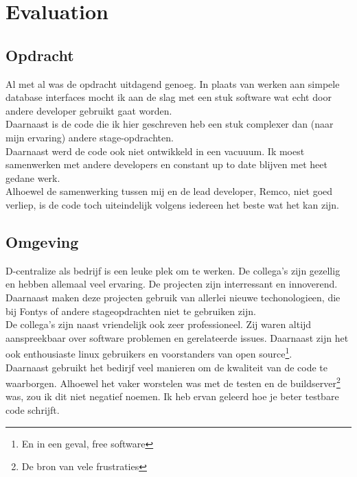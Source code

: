 \chapter{Evaluation}

\section{Opdracht}

Al met al was de opdracht uitdagend genoeg. In plaats van werken aan simpele database interfaces mocht ik aan de slag met een stuk software wat echt door andere developer gebruikt gaat worden. \\

Daarnaast is de code die ik hier geschreven heb een stuk complexer dan (naar mijn ervaring) andere stage-opdrachten. \\

Daarnaast werd de code ook niet ontwikkeld in een vacuuum. Ik moest samenwerken met andere developers en constant up to date blijven met heet gedane werk. \\ 

Alhoewel de samenwerking tussen mij en de lead developer, Remco, niet goed verliep, is de code toch uiteindelijk volgens iedereen het beste wat het kan zijn.

\section{Omgeving}

D-centralize als bedrijf is een leuke plek om te werken. De collega's zijn gezellig en hebben allemaal veel ervaring. De projecten zijn interressant en innoverend. Daarnaast maken deze projecten gebruik van allerlei nieuwe techonologieen, die bij Fontys of andere stageopdrachten niet te gebruiken zijn. \\

De collega's zijn naast vriendelijk ook zeer professioneel. Zij waren altijd aanspreekbaar over software problemen en gerelateerde issues. Daarnaast zijn het ook enthousiaste linux gebruikers en voorstanders van open source\footnote{En in een geval, free software}. \\

Daarnaast gebruikt het bedirjf veel manieren om de kwaliteit van de code te waarborgen. Alhoewel het vaker worstelen was met de testen en de buildserver\footnote{De bron van vele frustraties} was, zou ik dit niet negatief noemen. Ik heb ervan geleerd hoe je beter testbare code schrijft. \\

